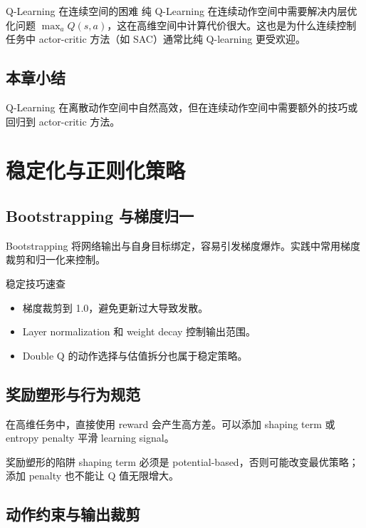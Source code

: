 \documentclass[a4paper]{article}
\begin{document}
\begin{warningbox}{Q-Learning 在连续空间的困难}
纯 Q-Learning 在连续动作空间中需要解决内层优化问题 $\max_a Q(s,a)$，这在高维空间中计算代价很大。这也是为什么连续控制任务中 actor-critic 方法（如 SAC）通常比纯 Q-learning 更受欢迎。
\end{warningbox}

\subsection{本章小结}
 
Q-Learning 在离散动作空间中自然高效，但在连续动作空间中需要额外的技巧或回归到 actor-critic 方法。

\section{稳定化与正则化策略}

\subsection{Bootstrapping 与梯度归一}

Bootstrapping 将网络输出与自身目标绑定，容易引发梯度爆炸。实践中常用梯度裁剪和归一化来控制。

\begin{importantbox}{稳定技巧速查}
\begin{itemize}
    \item 梯度裁剪到 1.0，避免更新过大导致发散。
    \item Layer normalization 和 weight decay 控制输出范围。
    \item Double Q 的动作选择与估值拆分也属于稳定策略。
\end{itemize}
\end{importantbox}

\subsection{奖励塑形与行为规范}

在高维任务中，直接使用 reward 会产生高方差。可以添加 shaping term 或 entropy penalty 平滑 learning signal。

\begin{warningbox}{奖励塑形的陷阱}
shaping term 必须是 potential-based，否则可能改变最优策略；添加 penalty 也不能让 Q 值无限增大。
\end{warningbox}

\subsection{动作约束与输出裁剪}
\end{document}
